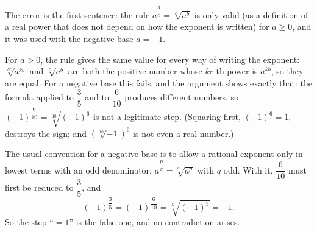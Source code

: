 The error is the first sentence: the rule $a^{\dfrac bc}=\sqrt[c]{a^b}$ is only valid (as a definition of a real power that does not depend on how the exponent is written) for $a\ge0$, and it was used with the negative base $a=-1$.

For $a>0$, the rule gives the same value for every way of writing the exponent: $\sqrt[kc]{a^{kb}}$ and $\sqrt[c]{a^b}$ are both the positive number whose $kc$-th power is $a^{kb}$, so they are equal. For a negative base this fails, and the argument shows exactly that: the formula applied to $\dfrac35$ and to $\dfrac{6}{10}$ produces different numbers, so $(-1)^{\dfrac{6}{10}}=\sqrt[10]{(-1)^6}$ is not a legitimate step. (Squaring first, $(-1)^6=1$, destroys the sign; and $\left(\sqrt[10]{-1}\right)^6$ is not even a real number.)

The usual convention for a negative base is to allow a rational exponent only in lowest terms with an odd denominator, $a^{\dfrac pq}=\sqrt[q]{a^p}$ with $q$ odd. With it, $\dfrac{6}{10}$ must first be reduced to $\dfrac35$, and
\[(-1)^{\dfrac35}=(-1)^{\dfrac{6}{10}}=\sqrt[5]{(-1)^3}=\boxed{-1}.\]
So the step ``$=1$'' is the false one, and no contradiction arises.
